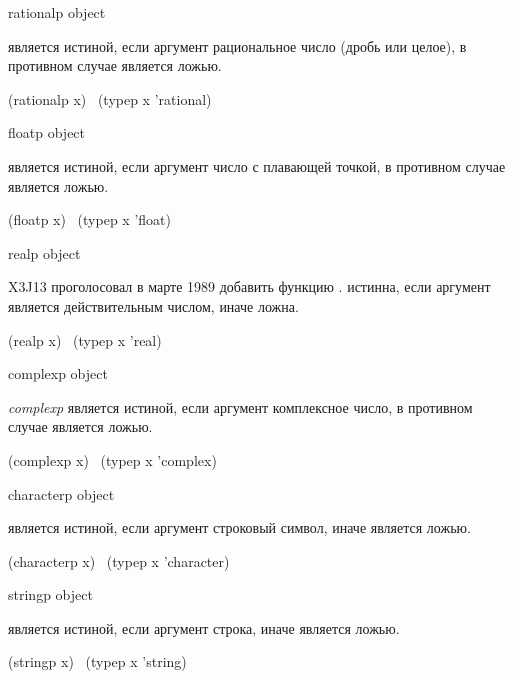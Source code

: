 \begin{defun}[Функция]
rationalp object

 является истиной, если аргумент рациональное число (дробь или
целое), в противном случае является ложью.
\begin{lisp}
(rationalp x) \EQ\ (typep x 'rational)
\end{lisp}
\end{defun}

\begin{defun}[Функция]
floatp object

 является истиной, если аргумент число с плавающей точкой, в
противном случае является ложью.
\begin{lisp}
(floatp x) \EQ\ (typep x 'float)
\end{lisp}
\end{defun}

\begin{newer}
\begin{defun}[Функция]
realp object


X3J13 проголосовал в марте 1989  добавить функцию  .
 истинна, если аргумент является действительным числом,
иначе ложна.
\begin{lisp}
(realp x) \EQ\ (typep x 'real)
\end{lisp}
\end{defun}
\end{newer}

\begin{defun}[Функция]
complexp object

\emph{complexp} является истиной, если аргумент комплексное число, в противном
случае является ложью.
\begin{lisp}
(complexp x) \EQ\ (typep x 'complex)
\end{lisp}
\end{defun}

\begin{defun}[Функция]
characterp object

 является истиной, если аргумент строковый символ, иначе
является ложью.
\begin{lisp}
(characterp x) \EQ\ (typep x 'character)
\end{lisp}
\end{defun}

\begin{defun}[Функция]
stringp object

 является истиной, если аргумент строка, иначе является ложью.
\begin{lisp}
(stringp x) \EQ\ (typep x 'string)
\end{lisp}
\end{defun}

